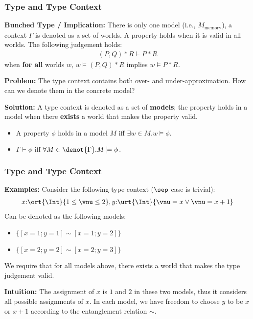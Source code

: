 \begin{frame}[fragile]
    \frametitle{Type and Type Context}

\textbf{Bunched Type / Implication:} There is only one model (i.e., $M_\text{memory}$), a context $\Gamma$ is denoted as a set of worlds. A property holds when it is valid in all worlds. The following judgement holds:
\begin{align*}
    (P, Q) * R \vdash P * R 
\end{align*}\noindent
when \textbf{for all} worlds $w$, $w \models (P, Q) * R$ implies $w \models P * R$.

\textbf{Problem:} The type context contains both over- and under-approximation. How can we denote them in the concrete model?

\textbf{Solution:} A type context is denoted as a set of \textbf{models}; the property holds in a model when there \textbf{exists} a world that makes the property valid.
\begin{itemize}
    \item A property $\phi$ holds in a model $M$ iff $\exists w \in M. w \models \phi$.
    \item $\Gamma \vdash \phi$ iff $\forall M \in \denot{\Gamma}. M \models \phi$.
\end{itemize}
\end{frame}

\begin{frame}[fragile]
    \frametitle{Type and Type Context}

\textbf{Examples:} Consider the following type context ($\sep$ case is trivial):
\begin{align*}
    x{:}\ort{\Int}{1 \leq \vnu \leq 2}, y{:}\urt{\Int}{\vnu = x \lor \vnu = x + 1}
\end{align*}\noindent
Can be denoted as the following models:
\begin{itemize}
    \item $\{[x=1;y=1] \sim [x=1;y=2]\}$
    \item $\{[x=2;y=2] \sim [x=2;y=3]\}$
\end{itemize}
We require that for all models above, there exists a world that makes the type judgement valid.

\textbf{Intuition:} The assignment of $x$ is $1$ and $2$ in these two models, thus it considers all possible assignments of $x$. In each model, we have freedom to choose $y$ to be $x$ or $x + 1$ according to the entanglement relation $\sim$.
\end{frame}

